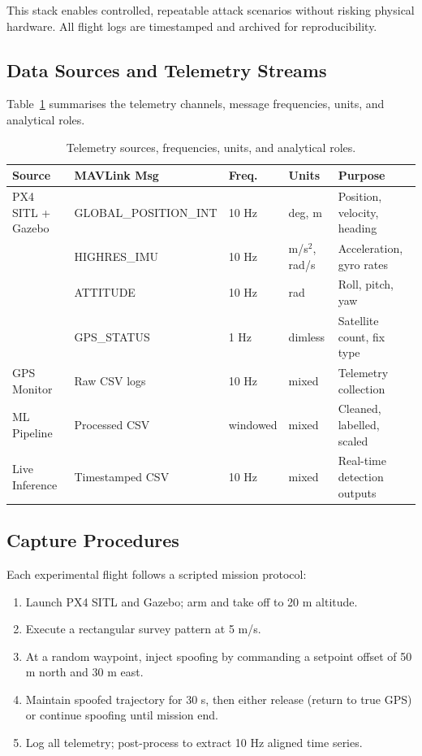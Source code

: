 \documentclass[11pt,a4paper]{article}
\begin{document}
This stack enables controlled, repeatable attack scenarios without risking physical hardware. All flight logs are timestamped and archived for reproducibility.

\subsection{Data Sources and Telemetry Streams}

Table~\ref{tab:data_sources} summarises the telemetry channels, message frequencies, units, and analytical roles.

\begin{table}[H]
\centering
\caption{Telemetry sources, frequencies, units, and analytical roles.}
\label{tab:data_sources}
\begin{tabular}{@{}lllll@{}}
\toprule
\textbf{Source} & \textbf{MAVLink Msg} & \textbf{Freq.} & \textbf{Units} & \textbf{Purpose} \\
\midrule
PX4 SITL + Gazebo & GLOBAL\_POSITION\_INT & 10 Hz & deg, m & Position, velocity, heading \\
 & HIGHRES\_IMU & 10 Hz & m/s$^2$, rad/s & Acceleration, gyro rates \\
 & ATTITUDE & 10 Hz & rad & Roll, pitch, yaw \\
 & GPS\_STATUS & 1 Hz & dimless & Satellite count, fix type \\
GPS Monitor & Raw CSV logs & 10 Hz & mixed & Telemetry collection \\
ML Pipeline & Processed CSV & windowed & mixed & Cleaned, labelled, scaled \\
Live Inference & Timestamped CSV & 10 Hz & mixed & Real-time detection outputs \\
\bottomrule
\end{tabular}
\end{table}

\subsection{Capture Procedures}

Each experimental flight follows a scripted mission protocol:
\begin{enumerate}
    \item Launch PX4 SITL and Gazebo; arm and take off to 20 m altitude.
    \item Execute a rectangular survey pattern at 5 m/s.
    \item At a random waypoint, inject spoofing by commanding a setpoint offset of 50 m north and 30 m east.
    \item Maintain spoofed trajectory for 30 s, then either release (return to true GPS) or continue spoofing until mission end.
    \item Log all telemetry; post-process to extract 10 Hz aligned time series.
\end{enumerate}
\end{document}
